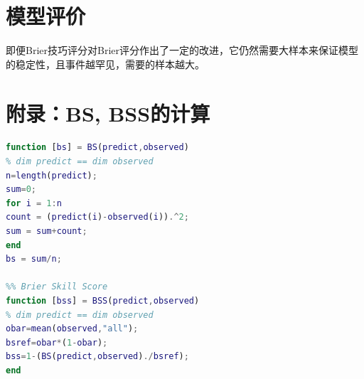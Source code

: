 \documentclass[a4paper,12pt,onecolumn,twoside]{article}
\begin{document}
\section{模型评价}
即便Brier技巧评分对Brier评分作出了一定的改进，它仍然需要大样本来保证模型的稳定性，且事件越罕见，需要的样本越大。


	
	
	
\section*{附录：BS, BSS的计算}
\begin{lstlisting}[language=MATLAB]
%% Brier Score
function [bs] = BS(predict,observed)
% dim predict == dim observed
n=length(predict);
sum=0;
for i = 1:n
count = (predict(i)-observed(i)).^2;
sum = sum+count;
end
bs = sum/n;

%% Brier Skill Score
function [bss] = BSS(predict,observed)
% dim predict == dim observed
obar=mean(observed,"all");
bsref=obar*(1-obar);
bss=1-(BS(predict,observed)./bsref);
end
\end{lstlisting}
\end{document}
